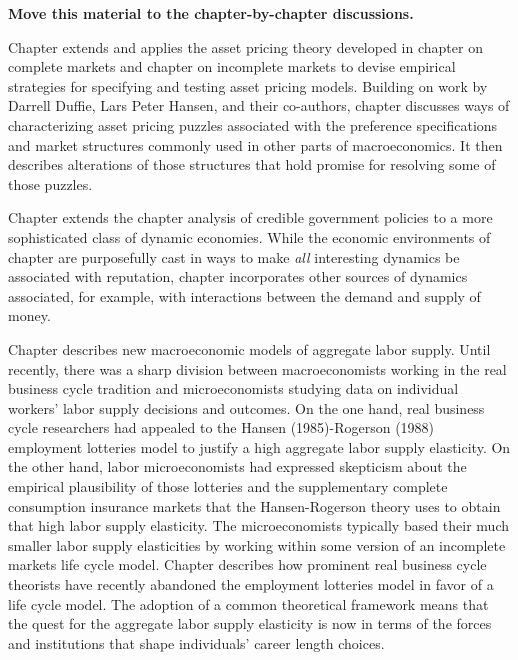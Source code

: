 
{\bf Move this material to the chapter-by-chapter discussions.}


Chapter  extends and applies the asset pricing theory developed in chapter  on complete markets  and  chapter  on incomplete markets
  to devise  empirical strategies for specifying and testing
asset pricing models.   Building on work by Darrell Duffie, Lars Peter Hansen,  and their co-authors,  chapter   discusses  ways of characterizing asset pricing puzzles
associated with the preference specifications and market structures commonly used in other parts of macroeconomics.
It then describes alterations of those structures that hold promise for  resolving some of those puzzles.
%
%


Chapter   extends the chapter  analysis of  credible government policies to a
more sophisticated  class of dynamic economies.  While the economic environments of  chapter  are purposefully
cast in  ways to make {\it all\/} interesting dynamics be associated with reputation, chapter  incorporates other sources of dynamics
 associated, for example, with  interactions between the demand and supply of money.


Chapter  describes  new  macroeconomic models of aggregate labor supply.
Until recently, there was a sharp division between macroeconomists working in the real business cycle tradition and microeconomists
studying data on individual workers'  labor supply decisions and outcomes.  On the one hand, real business cycle researchers
had appealed to the Hansen (1985)-Rogerson (1988) employment lotteries model to justify a high aggregate labor supply elasticity.
On the other hand, labor  microeconomists had expressed skepticism about the empirical plausibility of those lotteries and the supplementary complete consumption insurance markets that
the Hansen-Rogerson theory uses to obtain that high labor supply elasticity.  The microeconomists typically based their much smaller labor supply elasticities
by working within some version of an incomplete markets life cycle model.  Chapter  describes how prominent
real business cycle theorists have recently abandoned the employment lotteries model in favor of a life cycle model.
The adoption of a common theoretical framework means that the quest for the
aggregate labor supply elasticity is now in terms of the forces and institutions
that shape individuals' career length choices.
%
%


